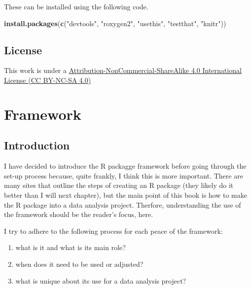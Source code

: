 \documentclass[]{book}
\newenvironment{Shaded}{\begin{snugshade}}{\end{snugshade}}
\newcommand{\KeywordTok}[1]{\textcolor[rgb]{0.13,0.29,0.53}{\textbf{#1}}}
\newcommand{\NormalTok}[1]{#1}
\newcommand{\StringTok}[1]{\textcolor[rgb]{0.31,0.60,0.02}{#1}}
\providecommand{\tightlist}{%
  \setlength{\itemsep}{0pt}\setlength{\parskip}{0pt}}
\begin{document}
These can be installed using the following code.

\begin{Shaded}
\begin{Highlighting}[]
\KeywordTok{install.packages}\NormalTok{(}\KeywordTok{c}\NormalTok{(}\StringTok{"devtools"}\NormalTok{, }\StringTok{"roxygen2"}\NormalTok{, }\StringTok{"usethis"}\NormalTok{, }\StringTok{"testthat"}\NormalTok{, }\StringTok{"knitr"}\NormalTok{))}
\end{Highlighting}
\end{Shaded}

\hypertarget{license}{%
\section*{License}\label{license}}

This work is under a \href{http://creativecommons.org/licenses/by-nc-sa/4.0/}{Attribution-NonCommercial-ShareAlike 4.0 International License (CC BY-NC-SA 4.0)}

\hypertarget{framework}{%
\chapter{Framework}\label{framework}}

\hypertarget{introduction}{%
\section{Introduction}\label{introduction}}

I have decided to introduce the R packagge framework before going through the set-up process because, quite frankly, I think this is more important. There are many sites that outline the steps of creating an R package (they likely do it better than I will next chapter), but the main point of this book is how to make the R package into a data analysis project. Therfore, understanding the use of the framework should be the reader's focus, here.

I try to adhere to the following process for each peace of the framework:

\begin{enumerate}
\def\labelenumi{\arabic{enumi}.}
\tightlist
\item
  what is it and what is its main role?
\item
  when does it need to be used or adjusted?
\item
  what is unique about its use for a data analysis project?
\end{enumerate}
\end{document}
